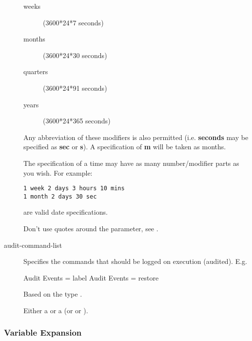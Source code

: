 \begin{description}
\begin{description}
\item [weeks]
    (3600*24*7 seconds)

\item [months]
    (3600*24*30 seconds)

\item [quarters]
    (3600*24*91 seconds)

\item [years]
    (3600*24*365 seconds)

\end{description}

Any abbreviation of these modifiers is also permitted (i.e.  {\bf seconds}
may be specified as {\bf sec} or {\bf s}).  A specification of {\bf m} will
be taken as months.

The specification of a time may have as many number/modifier parts as you
wish.  For example:

\footnotesize
\begin{verbatim}
1 week 2 days 3 hours 10 mins
1 month 2 days 30 sec
\end{verbatim}
\normalsize

are valid date specifications.

    Don't use quotes around the parameter, see .


\item [audit-command-list]
    \label{DataTypeAuditCommandList}
    Specifies the commands that should be logged on execution (audited).
    E.g.
\begin{bconfig}{}
Audit Events = label
Audit Events = restore
\end{bconfig}
    Based on the type \dtStringList.



\item [\yesno]
    \label{DataTypeYesNo}
   Either a  or a  (or  or ).


\end{description}




\subsubsection{Variable Expansion}
    \label{VarsChapter}

